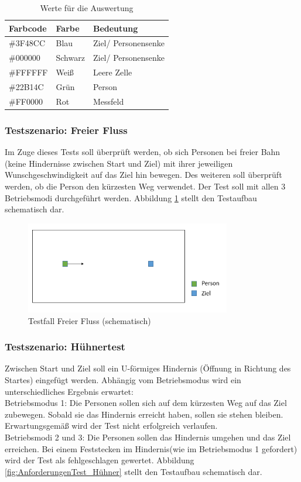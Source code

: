 \begin{table}[htpb]
	\centering
	\begin{tabular}{lll}
		Farbcode & Farbe & Bedeutung\\ \hline
		\#3F48CC & Blau & Ziel/ Personensenke \\	
		\#000000 & Schwarz & Ziel/ Personensenke \\
		\#FFFFFF & Weiß & Leere Zelle \\
		\#22B14C & Grün & Person \\
		\#FF0000 & Rot  & Messfeld
	\end{tabular}
	\caption{Werte für die Auswertung}
	\label{tab:Farbcodes}
\end{table}
 
\subsubsection{Testszenario: Freier Fluss}
Im Zuge dieses Tests soll überprüft werden, ob sich Personen bei freier Bahn (keine Hindernisse zwischen Start und Ziel) mit ihrer jeweiligen Wunschgeschwindigkeit auf das Ziel hin bewegen. Des weiteren soll überprüft werden, ob die Person den kürzesten Weg verwendet. Der Test soll mit allen 3 Betriebsmodi durchgeführt werden. Abbildung \ref{fig:AnforderungenTest_FreierFluss} stellt den Testaufbau schematisch dar.

\begin{figure}[htpb]
	\centering
	\includegraphics[width=0.8\textwidth]{abbildungen/Test_FreierFluss.png}
	\caption{Testfall Freier Fluss (schematisch)}
	\label{fig:AnforderungenTest_FreierFluss}
\end{figure}

\subsubsection{Testszenario: Hühnertest}
Zwischen Start und Ziel soll ein U-förmiges Hindernis (Öffnung in Richtung des Startes) eingefügt werden. Abhängig vom Betriebsmodus wird ein unterschiedliches Ergebnis erwartet:\\
Betriebsmodus 1: Die Personen sollen sich auf dem kürzesten Weg auf das Ziel zubewegen. Sobald sie das Hindernis erreicht haben, sollen sie stehen bleiben. Erwartungsgemäß wird der Test nicht erfolgreich verlaufen. \\
Betriebsmodi 2 und 3: Die Personen sollen das Hindernis umgehen und das Ziel erreichen. Bei einem \glqq Feststecken im Hindernis\grqq (wie im Betriebsmodus 1 gefordert) wird der Test als fehlgeschlagen gewertet. Abbildung \ref{fig:AnforderungenTest_Hühner} stellt den Testaufbau schematisch dar.

